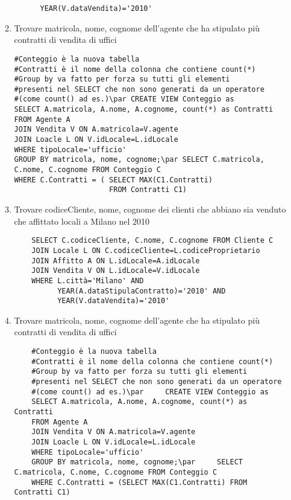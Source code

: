 \documentclass[a4paper]{article}
\begin{document}
\begin{enumerate}
\begin{enumerate}
\begin{verbatim}
      YEAR(V.dataVendita)='2010'
\end{verbatim}
\item Trovare matricola, nome, cognome dell'agente che ha stipulato più contratti di vendita di uffici
\begin{verbatim}
#Conteggio è la nuova tabella
#Contratti è il nome della colonna che contiene count(*)
#Group by va fatto per forza su tutti gli elementi
#presenti nel SELECT che non sono generati da un operatore
#(come count() ad es.)\par CREATE VIEW Conteggio as
SELECT A.matricola, A.nome, A.cognome, count(*) as Contratti
FROM Agente A
JOIN Vendita V ON A.matricola=V.agente
JOIN Loacle L ON V.idLocale=L.idLocale
WHERE tipoLocale='ufficio'
GROUP BY matricola, nome, cognome;\par SELECT C.matricola, C.nome, C.cognome FROM Conteggio C
WHERE C.Contratti = ( SELECT MAX(C1.Contratti)
                      FROM Contratti C1)
\end{verbatim}
  \item Trovare codiceCliente, nome, cognome dei clienti che abbiano sia venduto che affittato locali a Milano nel 2010
  \begin{verbatim}
    SELECT C.codiceCliente, C.nome, C.cognome FROM Cliente C
    JOIN Locale L ON C.codiceCliente=L.codiceProprietario
    JOIN Affitto A ON L.idLocale=A.idLocale
    JOIN Vendita V ON L.idLocale=V.idLocale
    WHERE L.città='Milano' AND
          YEAR(A.dataStipulaContratto)='2010' AND
          YEAR(V.dataVendita)='2010'
  \end{verbatim}
  \item Trovare matricola, nome, cognome dell'agente che ha stipulato più contratti di vendita di uffici
  \begin{verbatim}
    #Conteggio è la nuova tabella
    #Contratti è il nome della colonna che contiene count(*)
    #Group by va fatto per forza su tutti gli elementi
    #presenti nel SELECT che non sono generati da un operatore
    #(come count() ad es.)\par     CREATE VIEW Conteggio as
    SELECT A.matricola, A.nome, A.cognome, count(*) as Contratti
    FROM Agente A
    JOIN Vendita V ON A.matricola=V.agente
    JOIN Loacle L ON V.idLocale=L.idLocale
    WHERE tipoLocale='ufficio'
    GROUP BY matricola, nome, cognome;\par     SELECT C.matricola, C.nome, C.cognome FROM Conteggio C
    WHERE C.Contratti = (SELECT MAX(C1.Contratti) FROM Contratti C1)
  \end{verbatim}
\end{enumerate}

\end{enumerate}
\end{document}
